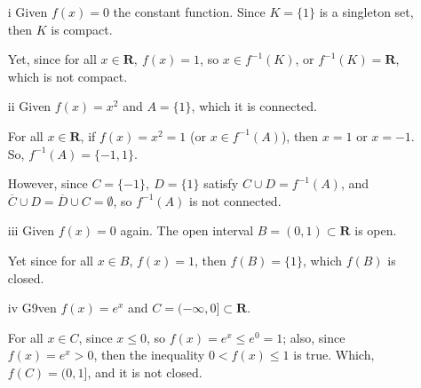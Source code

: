 \documentclass{article}
\begin{document}
\hfill

\begin{itemize}
    \item[i]
    Given $f(x)=0$ the constant function. Since $K=\{1\}$ is a singleton set, then $K$ is compact. 
    
    Yet, since for all $x\in\mathbf{R},\ f(x)=1$, so $x\in f^{-1}(K)$, or $f^{-1}(K)=\mathbf{R}$, which is not compact.

    \hfill 

    \item[ii]
    Given $f(x)=x^2$ and $A=\{1\}$, which it is connected. 
    
    For all $x\in\mathbf{R}$, if $f(x)=x^2=1$ (or $x\in f^{-1}(A)$), then $x=1$ or $x=-1$. So, $f^{-1}(A)=\{-1,1\}$.

    However, since $C=\{-1\},\ D=\{1\}$ satisfy $C\cup D = f^{-1}(A)$, and $\overline{C} \cup D = \overline{D}\cup C = \emptyset$, so $f^{-1}(A)$ is not connected.

    \hfill 

    \item[iii]
    Given $f(x)=0$ again. The open interval $B=(0,1)\subset \mathbf{R}$ is open.
    
    Yet since for all $x\in B$, $f(x)=1$, then $f(B)=\{1\}$, which $f(B)$ is closed.

    \hfill 

    \item[iv]  
    G9ven $f(x) = e^x$ and $C=(-\infty, 0]\subset \mathbf{R}$. 
    
    For all $x\in C$, since $x\leq 0$, so $f(x)=e^x\leq e^0=1$; also, since $f(x)=e^x>0$, then the inequality $0<f(x) \leq 1$ is true. Which, $f(C) = (0,1]$, and it is not closed.
\end{itemize}
\end{document}
